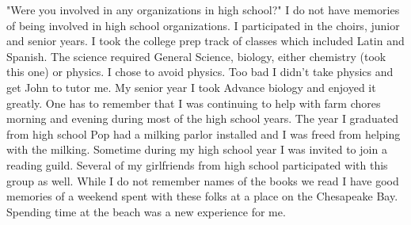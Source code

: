 "Were you involved in any organizations in high school?"
I do not have memories of being involved in high school organizations. I participated in the choirs, junior and senior years. I took the college prep track of classes which included Latin and Spanish. The science required General Science, biology, either chemistry (took this one) or physics.  I chose to avoid physics. Too bad I didn't take physics and get John to tutor me. My senior year I took Advance biology and enjoyed it greatly. One has to remember that I was continuing to help with farm chores morning and evening during most of the high school years. The year I graduated from high school Pop had a milking parlor installed and I was freed from helping with the milking.
Sometime during my high school year I was invited to join a reading guild. Several of my girlfriends from high school participated with this group as well. While I do not remember names of the books we read I have good memories of a weekend spent with these folks at a place on the Chesapeake Bay. Spending time at the beach was a new experience for me.





